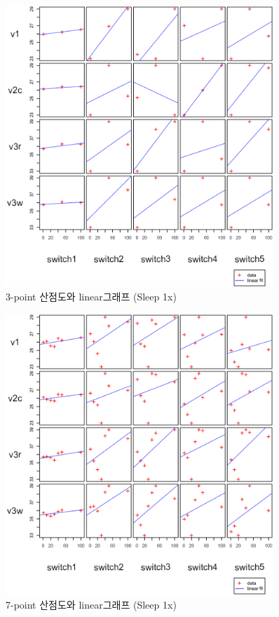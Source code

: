 \documentclass[11pt
  , a4paper
  , article
  , oneside
]{memoir}
\begin{document}
\begin{figure}[!htb]
  \centering
  \includegraphics[width=0.9\textwidth]{./images/3point_sleepx.eps}
  \caption{3-point 산점도와 linear그래프 (Sleep 1x)}
  \label{fig:3psx}   
\end{figure}

\begin{figure}[!htb]
  \centering
  \includegraphics[width=0.9\textwidth]{./images/7point_sleepx.eps}
  \caption{7-point 산점도와 linear그래프 (Sleep 1x)}
  \label{fig:7psx}   
\end{figure}
\end{document}
